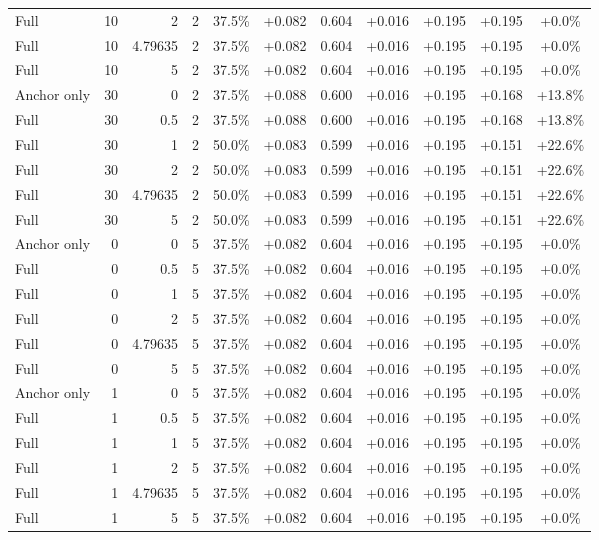 \begin{table}[htbp]
\begin{tabular}{lrrrccccccc}
Full & 10 & 2 & 2 & 37.5\% & +0.082 & 0.604 & +0.016 & +0.195 & +0.195 & +0.0\% \\
Full & 10 & 4.79635 & 2 & 37.5\% & +0.082 & 0.604 & +0.016 & +0.195 & +0.195 & +0.0\% \\
Full & 10 & 5 & 2 & 37.5\% & +0.082 & 0.604 & +0.016 & +0.195 & +0.195 & +0.0\% \\
Anchor only & 30 & 0 & 2 & 37.5\% & +0.088 & 0.600 & +0.016 & +0.195 & +0.168 & +13.8\% \\
Full & 30 & 0.5 & 2 & 37.5\% & +0.088 & 0.600 & +0.016 & +0.195 & +0.168 & +13.8\% \\
Full & 30 & 1 & 2 & 50.0\% & +0.083 & 0.599 & +0.016 & +0.195 & +0.151 & +22.6\% \\
Full & 30 & 2 & 2 & 50.0\% & +0.083 & 0.599 & +0.016 & +0.195 & +0.151 & +22.6\% \\
Full & 30 & 4.79635 & 2 & 50.0\% & +0.083 & 0.599 & +0.016 & +0.195 & +0.151 & +22.6\% \\
Full & 30 & 5 & 2 & 50.0\% & +0.083 & 0.599 & +0.016 & +0.195 & +0.151 & +22.6\% \\
Anchor only & 0 & 0 & 5 & 37.5\% & +0.082 & 0.604 & +0.016 & +0.195 & +0.195 & +0.0\% \\
Full & 0 & 0.5 & 5 & 37.5\% & +0.082 & 0.604 & +0.016 & +0.195 & +0.195 & +0.0\% \\
Full & 0 & 1 & 5 & 37.5\% & +0.082 & 0.604 & +0.016 & +0.195 & +0.195 & +0.0\% \\
Full & 0 & 2 & 5 & 37.5\% & +0.082 & 0.604 & +0.016 & +0.195 & +0.195 & +0.0\% \\
Full & 0 & 4.79635 & 5 & 37.5\% & +0.082 & 0.604 & +0.016 & +0.195 & +0.195 & +0.0\% \\
Full & 0 & 5 & 5 & 37.5\% & +0.082 & 0.604 & +0.016 & +0.195 & +0.195 & +0.0\% \\
Anchor only & 1 & 0 & 5 & 37.5\% & +0.082 & 0.604 & +0.016 & +0.195 & +0.195 & +0.0\% \\
Full & 1 & 0.5 & 5 & 37.5\% & +0.082 & 0.604 & +0.016 & +0.195 & +0.195 & +0.0\% \\
Full & 1 & 1 & 5 & 37.5\% & +0.082 & 0.604 & +0.016 & +0.195 & +0.195 & +0.0\% \\
Full & 1 & 2 & 5 & 37.5\% & +0.082 & 0.604 & +0.016 & +0.195 & +0.195 & +0.0\% \\
Full & 1 & 4.79635 & 5 & 37.5\% & +0.082 & 0.604 & +0.016 & +0.195 & +0.195 & +0.0\% \\
Full & 1 & 5 & 5 & 37.5\% & +0.082 & 0.604 & +0.016 & +0.195 & +0.195 & +0.0\% \\

\end{tabular}
\end{table}
